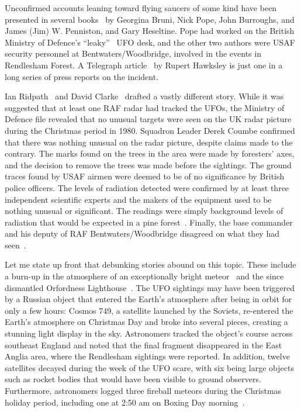 Unconfirmed accounts leaning toward flying saucers of some kind have been presented in several books~\cite{Bruni2000Nov,Pope2014Apr,Heseltine2023Feb} by Georgina Bruni, Nick Pope, John Burroughs, and James (Jim) W. Penniston, and Gary Heseltine.
Pope had worked on the British Ministry of Defence's ``leaky''~\cite{BibEntry2018May}
UFO desk, and the other two authors were USAF security personnel at Bentwaters/Woodbridge, involved in the events in Rendlesham Forest.
A Telegraph article~\cite{Hawksley-18}
by Rupert Hawksley is just one in a long series of press reports on the incident.

Ian Ridpath~\cite{Ridpath-Rend} and David Clarke~\cite{Clarke2011Mar}
drafted a vastly different story.
While it was suggested that at least one RAF radar had tracked the UFOs, the Ministry of Defence
file revealed that no unusual targets were seen on the UK radar picture during the Christmas period in 1980.
Squadron Leader Derek Coumbe confirmed that there was nothing unusual on the radar picture, despite claims made to the contrary.
The marks found on the trees in the area were made by foresters' axes, and the decision to remove the trees was made before the sightings.
The ground traces found by USAF airmen were deemed to be of no significance by British police officers.
The levels of radiation detected were confirmed by at least three
independent scientific experts and the makers of the equipment used to be nothing unusual or significant.
The readings were simply background levels of radiation that would be expected in a pine forest~\cite{Clarke2011Mar}.
Finally, the base commander and his deputy of RAF Bentwaters/Woodbridge disagreed on what they had seen~\cite{ClarkeBlog2023Jan}.


Let me state up front that debunking stories abound on this topic.
These include a burn-up in the atmosphere of an exceptionally bright meteor~\cite{Ridpath-Rend,Clarke2011Mar}
and the since dismantled Orfordness Lighthouse~\cite{Rigby2020Dec}.
The UFO sightings may have been triggered by a Russian object that entered the Earth's atmosphere after being in orbit for only a few hours:
Cosmos 749, a satellite launched by the Soviets, re-entered the Earth's atmosphere on Christmas Day and broke into several pieces,
creating a stunning light display in the sky.
Astronomers tracked the object's course across southeast England and noted that the final fragment disappeared in the East Anglia area,
where the Rendlesham sightings were reported.
In addition, twelve satellites decayed during the week of the UFO scare, with six being large objects such as rocket bodies that would have been visible to ground observers. Furthermore, astronomers logged three fireball meteors during the Christmas holiday period,
including one at 2:50 am on Boxing Day morning~\cite{Clarke2011Mar}.


